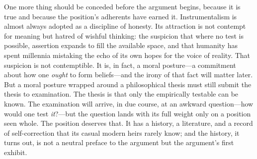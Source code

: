 One more thing should be conceded before the argument begins, because it is true and because the position's adherents have earned it. Instrumentalism is almost always adopted as a discipline of honesty. Its attraction is not contempt for meaning but hatred of wishful thinking: the suspicion that where no test is possible, assertion expands to fill the available space, and that humanity has spent millennia mistaking the echo of its own hopes for the voice of reality. That suspicion is not contemptible. It is, in fact, a moral posture---a commitment about how one \emph{ought} to form beliefs---and the irony of that fact will matter later. But a moral posture wrapped around a philosophical thesis must still submit the thesis to examination. The thesis is that only the empirically testable can be known. The examination will arrive, in due course, at an awkward question---how would one test \emph{it}?---but the question lands with its full weight only on a position seen whole. The position deserves that. It has a history, a literature, and a record of self-correction that its casual modern heirs rarely know; and the history, it turns out, is not a neutral preface to the argument but the argument's first exhibit.
